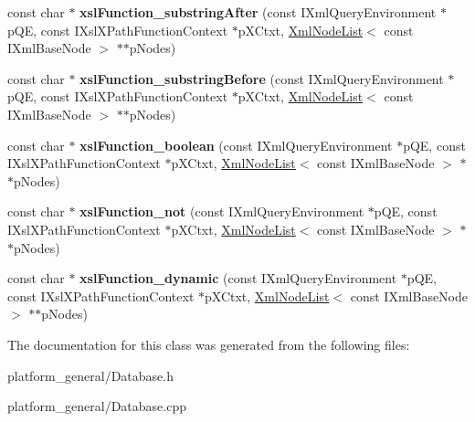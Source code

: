 \begin{DoxyCompactItemize}
\item 
\hypertarget{classgeneral__server_1_1EXSLTStrings_a775c3d18492ca55acfa54cbdf67e5df9}{const char $\ast$ {\bfseries xsl\-Function\-\_\-substring\-After} (const \-I\-Xml\-Query\-Environment $\ast$p\-Q\-E, const \-I\-Xsl\-X\-Path\-Function\-Context $\ast$p\-X\-Ctxt, \hyperlink{classgeneral__server_1_1XmlNodeList}{\-Xml\-Node\-List}$<$ const \-I\-Xml\-Base\-Node $>$ $\ast$$\ast$p\-Nodes)}\label{classgeneral__server_1_1EXSLTStrings_a775c3d18492ca55acfa54cbdf67e5df9}

\item 
\hypertarget{classgeneral__server_1_1EXSLTStrings_abd83e9c77651d77625d3906123be06da}{const char $\ast$ {\bfseries xsl\-Function\-\_\-substring\-Before} (const \-I\-Xml\-Query\-Environment $\ast$p\-Q\-E, const \-I\-Xsl\-X\-Path\-Function\-Context $\ast$p\-X\-Ctxt, \hyperlink{classgeneral__server_1_1XmlNodeList}{\-Xml\-Node\-List}$<$ const \-I\-Xml\-Base\-Node $>$ $\ast$$\ast$p\-Nodes)}\label{classgeneral__server_1_1EXSLTStrings_abd83e9c77651d77625d3906123be06da}

\item 
\hypertarget{classgeneral__server_1_1EXSLTStrings_a3075afe573fa456e114c044888c7398c}{const char $\ast$ {\bfseries xsl\-Function\-\_\-boolean} (const \-I\-Xml\-Query\-Environment $\ast$p\-Q\-E, const \-I\-Xsl\-X\-Path\-Function\-Context $\ast$p\-X\-Ctxt, \hyperlink{classgeneral__server_1_1XmlNodeList}{\-Xml\-Node\-List}$<$ const \-I\-Xml\-Base\-Node $>$ $\ast$$\ast$p\-Nodes)}\label{classgeneral__server_1_1EXSLTStrings_a3075afe573fa456e114c044888c7398c}

\item 
\hypertarget{classgeneral__server_1_1EXSLTStrings_adbc5a757753ceecc89bb3522782d2d43}{const char $\ast$ {\bfseries xsl\-Function\-\_\-not} (const \-I\-Xml\-Query\-Environment $\ast$p\-Q\-E, const \-I\-Xsl\-X\-Path\-Function\-Context $\ast$p\-X\-Ctxt, \hyperlink{classgeneral__server_1_1XmlNodeList}{\-Xml\-Node\-List}$<$ const \-I\-Xml\-Base\-Node $>$ $\ast$$\ast$p\-Nodes)}\label{classgeneral__server_1_1EXSLTStrings_adbc5a757753ceecc89bb3522782d2d43}

\item 
\hypertarget{classgeneral__server_1_1EXSLTStrings_a7137a5d7e4f579480bb617b0cc4c9a35}{const char $\ast$ {\bfseries xsl\-Function\-\_\-dynamic} (const \-I\-Xml\-Query\-Environment $\ast$p\-Q\-E, const \-I\-Xsl\-X\-Path\-Function\-Context $\ast$p\-X\-Ctxt, \hyperlink{classgeneral__server_1_1XmlNodeList}{\-Xml\-Node\-List}$<$ const \-I\-Xml\-Base\-Node $>$ $\ast$$\ast$p\-Nodes)}\label{classgeneral__server_1_1EXSLTStrings_a7137a5d7e4f579480bb617b0cc4c9a35}

\end{DoxyCompactItemize}


\-The documentation for this class was generated from the following files\-:\begin{DoxyCompactItemize}
\item 
platform\-\_\-general/\-Database.\-h\item 
platform\-\_\-general/\-Database.\-cpp\end{DoxyCompactItemize}
